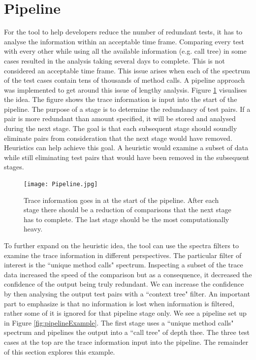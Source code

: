 \section{Pipeline }
\label{pipelinesection}
For the tool to help developers reduce the number of redundant tests, it has to analyse the information within an acceptable time frame. Comparing every test with every other while using all the available information (e.g. call tree) in some cases resulted in the analysis taking several days to complete. This is not considered an acceptable time frame. This issue arises when each of the spectrum of the test cases contain tens of thousands of method calls. A pipeline approach was implemented to get around this issue of lengthy analysis. Figure \ref{fig:pipeline} visualises the idea. The figure shows the trace information is input into the start of the pipeline. The purpose of a stage is to determine the redundancy of test pairs. If a pair is more redundant than amount specified, it will be stored and analysed during the next stage. The goal is that each subsequent stage should soundly eliminate pairs from consideration that the next stage would have removed. Heuristics can help achieve this goal. A heuristic would examine a subset of data while still eliminating test pairs that would have been removed in the subsequent stages. 

\begin{figure}[h]
\texttt{[image: Pipeline.jpg]}
\caption{Trace information goes in at the start of the pipeline. After each stage there should be a reduction of comparisons that the next stage has to complete. The last stage should be the most computationally heavy.}
\label{fig:pipeline}
\end{figure}

To further expand on the heuristic idea, the tool can use the spectra filters to examine the trace information in different perspectives. The particular filter of interest is the ``unique method calls" spectrum. Inspecting a subset of the trace data increased the speed of the comparison but as a consequence, it decreased the confidence of the output being truly redundant. We can increase the confidence by then analysing the output test pairs with a ``context tree" filter. An important part to emphasize is that no information is lost when information is filtered, rather some of it is ignored for that pipeline stage only. We see a pipeline set up in Figure \ref{fig:pipelineExample}. The first stage uses a ``unique method calls" spectrum and pipelines the output into a ``call tree" of depth thee. The three test cases at the top are the trace information input into the pipeline. The remainder of this section explores this example. 

